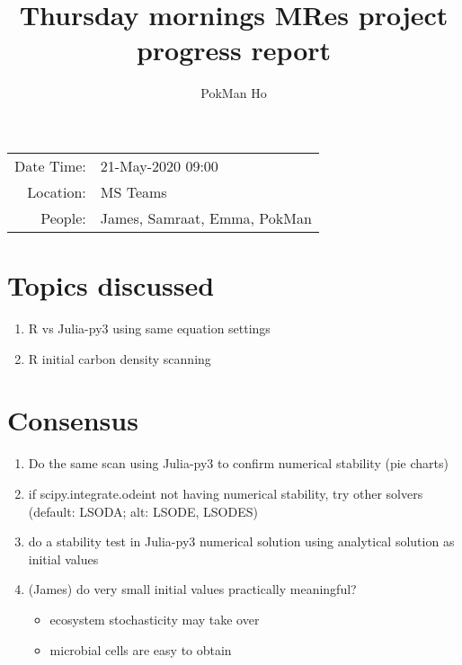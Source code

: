 \documentclass[a4paper,11pt]{article}
\title{Thursday mornings MRes project progress report}
\author{PokMan Ho}
\date{}
\begin{document}
    \maketitle
    
    \begin{tabular}{rl}
        Date Time: & 21-May-2020 09:00 \\
        Location: & MS Teams \\
        People: & James, Samraat, Emma, PokMan \\
    \end{tabular}
    
    \section{Topics discussed}
    \begin{enumerate}
        \item R vs Julia-py3 using same equation settings
        \item R initial carbon density scanning
    \end{enumerate}
    
    \section{Consensus}
    \begin{enumerate}
        \item Do the same scan using Julia-py3 to confirm numerical stability (pie charts)
        \item if scipy.integrate.odeint not having numerical stability, try other solvers (default: LSODA; alt: LSODE, LSODES)
        \item do a stability test in Julia-py3 numerical solution using analytical solution as initial values
        \item (James) do very small initial values practically meaningful?
        \begin{itemize}
            \item ecosystem stochasticity may take over
            \item microbial cells are easy to obtain
        \end{itemize}
    \end{enumerate}
\end{document}
